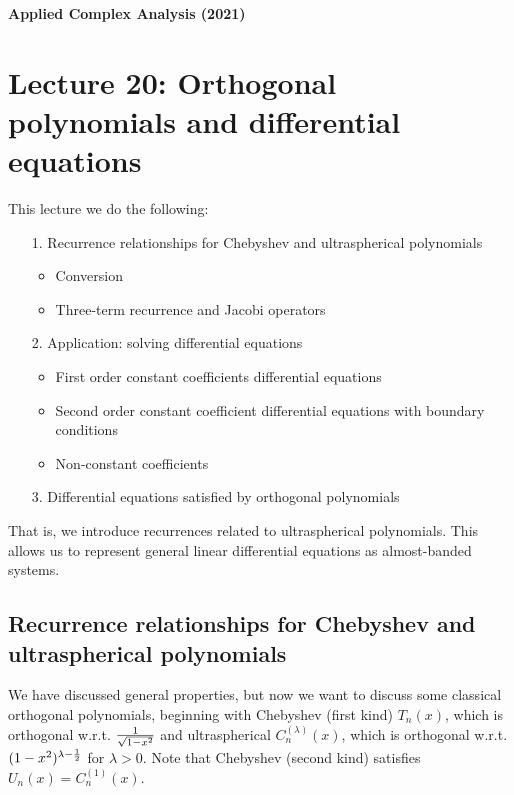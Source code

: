 \documentclass[12pt,a4paper]{article}
\def\half{ {1 \over 2} }
\begin{document}
\textbf{Applied Complex Analysis (2021)}

\section{Lecture 20: Orthogonal polynomials and differential equations}
This lecture we do the following:

\begin{itemize}
\item[1. ] Recurrence relationships for Chebyshev and ultraspherical polynomials

\begin{itemize}
\item Conversion


\item Three-term recurrence and Jacobi operators

\end{itemize}

\item[2. ] Application: solving differential equations

\begin{itemize}
\item First order constant coefficients differential equations


\item Second order constant coefficient differential equations with boundary conditions


\item Non-constant coefficients

\end{itemize}

\item[3. ] Differential equations satisfied by orthogonal polynomials

\end{itemize}
That is, we introduce recurrences related to ultraspherical polynomials. This allows us to represent general linear differential equations as almost-banded systems.

\subsection{Recurrence relationships for Chebyshev and ultraspherical polynomials}
We have discussed general properties, but now we want to discuss some classical orthogonal polynomials, beginning with Chebyshev (first kind) $T_n(x)$, which is orthogonal w.r.t. $1\over \sqrt{1-x^2}$ and ultraspherical $C_n^{(\lambda)}(x)$, which is orthogonal w.r.t. $(1-x^2)^{\lambda - \half}$ for $\lambda > 0$. Note that Chebyshev (second kind) satisfies $U_n(x) = C_n^{(1)}(x)$.
\end{document}
